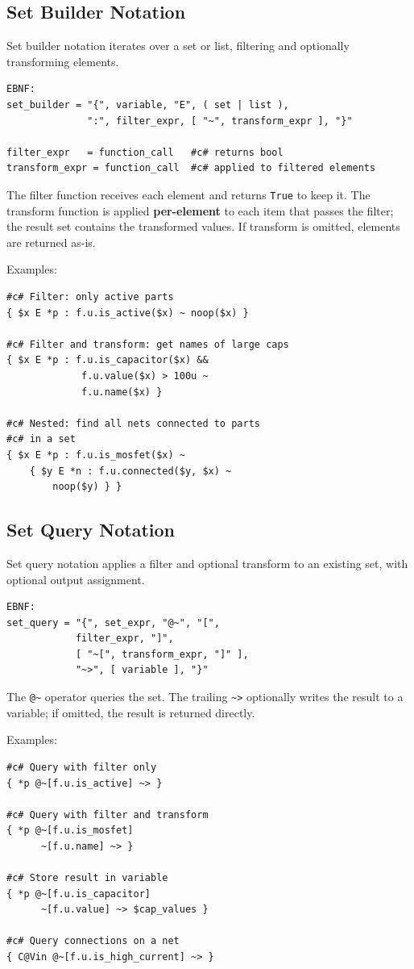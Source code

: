 \documentclass{report}
\begin{document}
\subsection{Set Builder Notation}
Set builder notation iterates over a set or list, filtering and optionally transforming elements.
\begin{verbatim}
EBNF:
set_builder = "{", variable, "E", ( set | list ), 
              ":", filter_expr, [ "~", transform_expr ], "}"

filter_expr   = function_call   #c# returns bool
transform_expr = function_call  #c# applied to filtered elements
\end{verbatim}

The filter function receives each element and returns \texttt{True} to keep it. The transform function is applied \textbf{per-element} to each item that passes the filter; the result set contains the transformed values. If transform is omitted, elements are returned as-is.

Examples:
\begin{verbatim}
#c# Filter: only active parts
{ $x E *p : f.u.is_active($x) ~ noop($x) }

#c# Filter and transform: get names of large caps
{ $x E *p : f.u.is_capacitor($x) && 
             f.u.value($x) > 100u ~ 
             f.u.name($x) }

#c# Nested: find all nets connected to parts 
#c# in a set
{ $x E *p : f.u.is_mosfet($x) ~ 
    { $y E *n : f.u.connected($y, $x) ~ 
        noop($y) } }
\end{verbatim}

\subsection{Set Query Notation}
Set query notation applies a filter and optional transform to an existing set, with optional output assignment.
\begin{verbatim}
EBNF:
set_query = "{", set_expr, "@~", "[", 
            filter_expr, "]", 
            [ "~[", transform_expr, "]" ],
            "~>", [ variable ], "}"
\end{verbatim}

The \texttt{@\~} operator queries the set. The trailing \texttt{\~{}>} optionally writes the result to a variable; if omitted, the result is returned directly.

Examples:
\begin{verbatim}
#c# Query with filter only
{ *p @~[f.u.is_active] ~> }

#c# Query with filter and transform
{ *p @~[f.u.is_mosfet] 
      ~[f.u.name] ~> }

#c# Store result in variable
{ *p @~[f.u.is_capacitor] 
      ~[f.u.value] ~> $cap_values }

#c# Query connections on a net
{ C@Vin @~[f.u.is_high_current] ~> }
\end{verbatim}
\end{document}
